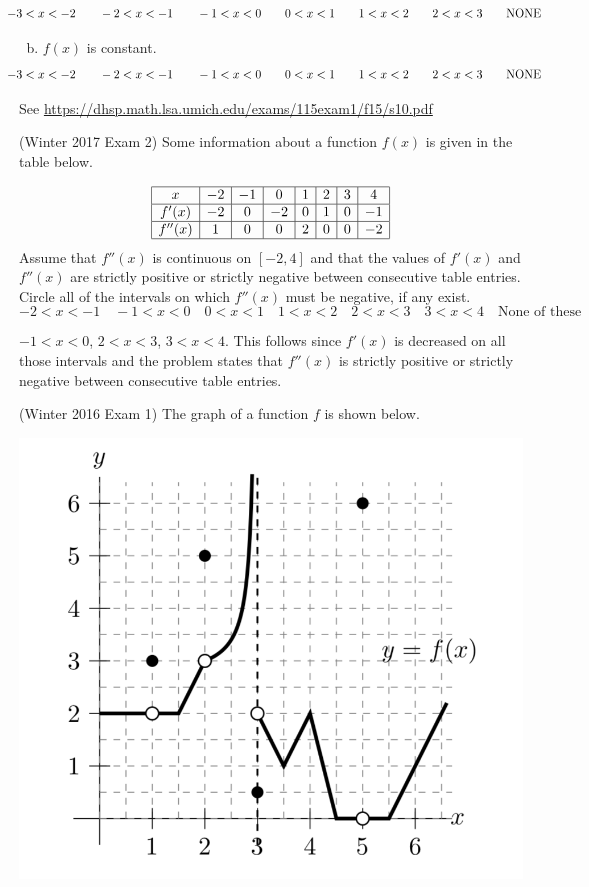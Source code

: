 \documentclass[11pt]{exam}
\begin{document}
\begin{questions}
\begin{enumerate}[(a)]
\[\hspace{-8ex}-3<x<-2 \qquad -2<x<-1 \qquad -1<x<0 \qquad 0<x<1 \qquad 1<x<2 \qquad 2<x<3 \qquad \text{NONE}\]
	\item $f(x)$ is constant.
\[\hspace{-8ex}-3<x<-2 \qquad -2<x<-1 \qquad -1<x<0 \qquad 0<x<1 \qquad 1<x<2 \qquad 2<x<3 \qquad \text{NONE}\]
\end{enumerate}
\begin{solution}
  See \href{https://dhsp.math.lsa.umich.edu/exams/115exam1/f15/s10.pdf}{https://dhsp.math.lsa.umich.edu/exams/115exam1/f15/s10.pdf}
\end{solution}
\question (Winter 2017 Exam 2) 	Some information about a function $f(x)$ is given in the table below.
	
$$\begin{array}{|c|c|c|c|c|c|c|c|}
\hline
	x &
-2 &
-1 &
0 &
1 &
2 &
3 &
4 \\
\hline
f'(x) &
-2 &
0 &
-2 &
0 &
1 &
0 &
-1 \\
\hline
f''(x) &
1 &
0 &
0 &
2 &
0 &
0 &
-2 \\
\hline
\end{array}$$
Assume that $f''(x)$ is continuous on $[-2,4]$ and that the values of $f'(x)$ and $f''(x)$ are strictly positive or strictly negative between consecutive table entries. Circle all of the intervals on which $f''(x)$ must be negative, if any exist.
$$-2 < x < -1 \quad -1 < x < 0 \quad 0 < x < 1 \quad 1 < x < 2
\quad 2<x<3 \quad 3<x<4 \quad \textrm{None of these}$$
\begin{solution}
  \(-1<x<0\), \(2<x<3\), \(3<x<4\). This follows since \(f'(x)\)
  is
  decreased on all those intervals and the problem states that
  \(f''(x)\) is strictly positive or strictly negative between
  consecutive table entries.
\end{solution}
\question (Winter 2016 Exam 1) 	The graph of a function $f$ is shown below.
  \begin{center}
    \includegraphics[scale=0.6]{discontinuities.png}
  \end{center}


\end{questions}
\end{document}
